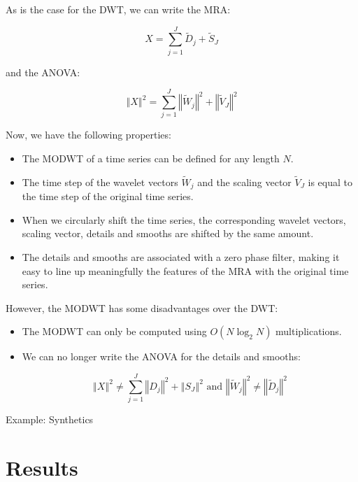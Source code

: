 \documentclass[draft]{agujournal2018}
\begin{document}
As is the case for the DWT, we can write the MRA:

\begin{equation}
X = \sum_{j = 1}^{J} \widetilde{D}_j + \widetilde{S}_J
\end{equation}

and the ANOVA:

\begin{equation}
\left\Vert X \right\Vert ^2 = \sum_{j = 1}^{J} \left\Vert \widetilde{W}_j \right\Vert ^2 + \left\Vert \widetilde{V}_J \right\Vert ^2
\end{equation}

Now, we have the following properties:

\begin{itemize}
	\item The MODWT of a time series can be defined for any length $N$.
	\item The time step of the wavelet vectors $\widetilde{W}_j$ and the scaling vector $\widetilde{V}_J$ is equal to the time step of the original time series.
	\item When we circularly shift the time series, the corresponding wavelet vectors, scaling vector, details and smooths are shifted by the same amount.
	\item The details and smooths are associated with a zero phase filter, making it easy to line up meaningfully the features of the MRA with the original time series.
\end{itemize}

However, the MODWT has some disadvantages over the DWT:

\begin{itemize}
	\item The MODWT can only be computed using $O \left( N \log_2 N \right)$ multiplications.
	\item We can no longer write the ANOVA for the details and smooths:

\begin{equation}
\left\Vert X \right\Vert ^2 \neq \sum_{j = 1}^{J} \left\Vert D_j \right\Vert ^2 + \left\Vert S_J \right\Vert ^2 \text{ and } \left\Vert \widetilde{W}_j \right\Vert ^2 \neq \left\Vert \widetilde{D}_j \right\Vert ^2
\end{equation}

\end{itemize}

Example: Synthetics

\section{Results}
\end{document}
